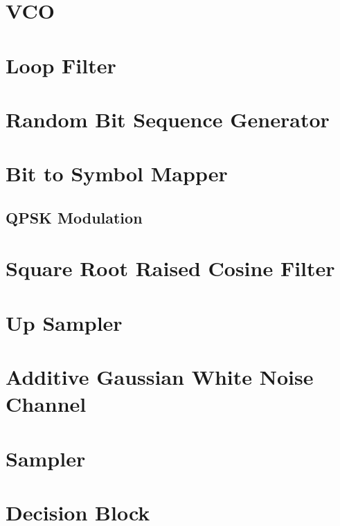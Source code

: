\documentclass[]{article}
\begin{document}
\section{VCO}


\section{Loop Filter}


\section{Random Bit Sequence Generator}
\label{app:random_bit_generator}


\section{Bit to Symbol Mapper}
\label{app:bittosym}

\subsection{QPSK Modulation}
\label{app:qpsk_mod}


\section{Square Root Raised Cosine Filter}
\label{app:sqrt_raised_cosine}


\section{Up Sampler}
\label{app:impulse_train}


\section{Additive Gaussian White Noise Channel}
\label{app:awgn_channel}


\section{Sampler}
\label{app:sampler}


\section{Decision Block}
\label{app:dblocks}
\end{document}
